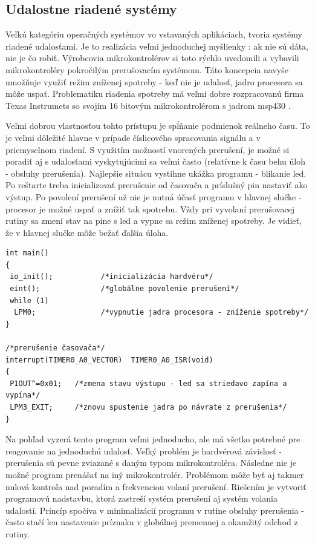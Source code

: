 \subsection{Udalostne riadené systémy}

Veľkú kategóriu operačných systémov vo vstavaných aplikáciach, tvoria systémy riadené udalosťami. Je to realizácia veľmi jednoduchej myšlienky : ak nie sú dáta, nie je čo robiť. Výrobcovia mikrokontrolérov si toto rýchlo uvedomili a vybavili mikrokontroléry pokročilým prerušovacím systémom. Táto koncepcia navyše umožňuje využiť režim zníženej spotreby - keď nie je udalosť, jadro procesora sa môže uspať.
Problematiku riadenia spotreby má veľmi dobre rozpracovanú firma Texas Instrumets so svojím 16 bitovým mikrokontrolérom s jadrom msp430 \cite {ti_msp430}.

Veľmi dobrou vlastnosťou tohto prístupu je spĺňanie podmienok reálneho času. To je veľmi dôležité hlavne v prípade číslicového spracovania signálu a v priemyselnom riadení. S využitím možností vnorených prerušení, je možné si poradiť aj s udalosťami vyskytujúcimi sa veľmi často (relatívne k času behu úloh - obsluhy prerušenia). Najlepšie situácu vystihne ukážka programu - blikanie led. Po reštarte treba inicializovať prerušenie od časovača a príslušný pin nastaviť ako výstup. Po povolení prerušení už nie je nutná účasť programu v hlavnej slučke - procesor je možné uspať a znížiť tak spotrebu. Vždy pri vyvolaní prerušovacej rutiny sa zmení stav na pine s led a vypne sa režim zníženej spotreby. Je vidieť, že v hlavnej slučke môže bežať ďalšia úloha.

{\small
\begin{verbatim}
int main()
{
 io_init();		  	  /*inicializácia hardvéru*/
 eint();			  /*globálne povolenie prerušení*/
 while (1)
  LPM0;				  /*vypnutie jadra procesora - zníženie spotreby*/
}

/*prerušenie časovača*/
interrupt(TIMER0_A0_VECTOR)  TIMER0_A0_ISR(void) 
{
 P1OUT^=0x01;	/*zmena stavu výstupu - led sa striedavo zapína a vypína*/
 LPM3_EXIT; 	/*znovu spustenie jadra po návrate z prerušenia*/
}
\end{verbatim}
}


Na pohľad vyzerá tento program veľmi jednoducho, ale má všetko potrebné pre reagovanie na jednoduchú udalosť. Veľký problém je hardvérová závislosť - prerušenia sú pevne zviazané s daným typom mikrokontroléra. Následne nie je možné program prenášať na iný mikrokontrolér. Problémom môže byť aj takmer nulová kontrola nad poradím a frekvenciou volaní prerušení. Riešením je vytvoriť programovú nadstavbu, ktorá zastreší systém prerušení aj systém volania udalostí. Princíp spočíva v minimalizácií programu v rutine obsluhy prerušenia - často stačí len nastavenie príznaku v globálnej premennej a okamžitý odchod z rutiny.

